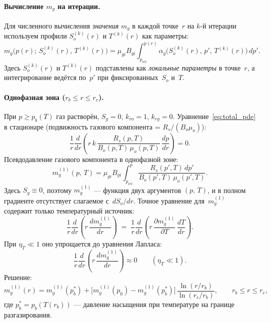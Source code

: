 ﻿\documentclass[12pt,a4paper]{article}
\begin{document}
\paragraph{Вычисление $m_g$ на итерации.}
Для численного вычисления \emph{значения} $m_g$
в каждой точке~$r$ на $k$-й итерации используем
профили $S_o^{(k)}(r)$ и $T^{(k)}(r)$ как
параметры:
\begin{equation}\label{eq:mo_frozen}
  m_g\bigl(p(r);\, S_o^{(k)}(r),\, T^{(k)}(r)\bigr)
  = \mu_{gi}B_{gi}\int_{p_{\mathrm{ref}}}^{p(r)}
   \alpha_g\bigl(S_o^{(k)}(r),\,p',\,T^{(k)}(r)\bigr)\,dp'.
\end{equation}
Здесь $S_o^{(k)}(r)$ и $T^{(k)}(r)$ подставлены
как \emph{локальные параметры} в точке~$r$,
а интегрирование ведётся по~$p'$ при
фиксированных~$S_o$ и~$T$.

\paragraph{Однофазная зона ($r_b \leqslant r \leqslant r_e$).}
При $p \geqslant p_b(T)$ газ растворён, $S_g = 0$, $k_{ro} = 1$,
$k_{rg} = 0$. Уравнение~\eqref{eq:total_pde} в стационаре
(подвижность газового компонента = $R_s/(B_o\mu_o)$):
\begin{equation}\label{eq:1ph_stat}
  \frac{1}{r}\frac{d}{dr}\left(r\,k\,
  \frac{R_s(p,T)}{B_o(p,T)\,\mu_o(p,T)}\,\frac{dp}{dr}\right) = 0.
\end{equation}
Псевдодавление газового компонента в однофазной зоне:
\begin{equation}\label{eq:mo_1ph}
  m_g^{(1)}(p,\,T) = \mu_{gi}B_{gi}\int_{p_{\mathrm{ref}}}^{p}
  \frac{R_s(p',T)\,dp'}{B_o(p',T)\,\mu_o(p',T)}.
\end{equation}
Здесь $S_g \equiv 0$, поэтому $m_g^{(1)}$ --- функция
двух аргументов $(p,\,T)$, и в полном градиенте
отсутствует слагаемое с~$dS_o/dr$. Точное уравнение
для~$m_g^{(1)}$ содержит только температурный
источник:
\begin{equation}\label{eq:laplace_1ph_corr}
  \frac{1}{r}\frac{d}{dr}\!\left(r\,\frac{dm_g^{(1)}}{dr}\right)
  \;=\;\frac{1}{r}\frac{d}{dr}\!\left(
    r\,\frac{\partial m_g^{(1)}}{\partial T}\,\frac{dT}{dr}
    \right).
\end{equation}
При $\eta_T \ll 1$ оно упрощается до уравнения Лапласа:
\begin{equation}\label{eq:laplace_1ph}
  \frac{1}{r}\frac{d}{dr}\left(r\,\frac{dm_g^{(1)}}{dr}\right)
  \approx 0
  \qquad (\eta_T \ll 1).
\end{equation}
Решение:
\begin{equation}\label{eq:mo_1ph_sol}
  m_g^{(1)}(r) = m_g^{(1)}(p_b^*)
  + \bigl[m_g^{(1)}(p_0) - m_g^{(1)}(p_b^*)\bigr]\,
  \frac{\ln(r/r_b)}{\ln(r_e/r_b)},
  \qquad r_b \leqslant r \leqslant r_e,
\end{equation}
где $p_b^* = p_b(T(r_b))$ --- давление насыщения при
температуре на границе разгазирования.
\end{document}
